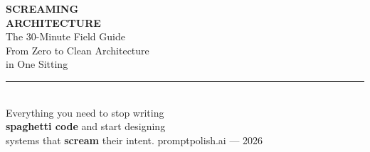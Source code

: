 \documentclass[12pt]{article}
\begin{document}
\begin{titlepage}
\centering
\vspace*{2cm}
{\Huge\bfseries\color{primary} SCREAMING\\[0.3cm] ARCHITECTURE\\[0.5cm]}
\vspace{0.5cm}
{\Large\color{secondary} The 30-Minute Field Guide\\[0.3cm]}
\vspace{1cm}
{\large\color{accent} From Zero to Clean Architecture\\[0.3cm]}
{\large\color{accent} in One Sitting}
\vspace{2cm}

\rule{0.6\textwidth}{0.5pt}\\[1cm]

{\small Everything you need to stop writing\\[0.2cm]
\textbf{spaghetti code} and start designing\\[0.2cm]
systems that \textbf{scream} their intent.}
\vfill
{\small \color{gray} promptpolish.ai — 2026}
\end{titlepage}
\end{document}
